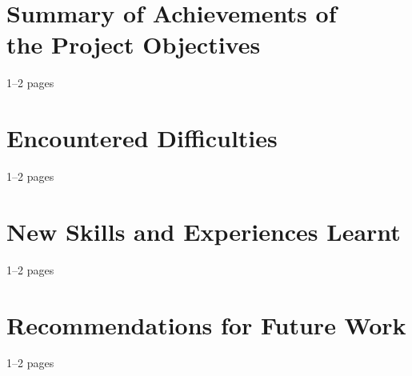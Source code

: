 \begin{chapterpage}
\end{chapterpage}
\section[Summary of Achievements of the Project Objectives]{Summary of Achievements of\\the Project Objectives}
1--2 pages
\section{Encountered Difficulties}
1--2 pages
\section{New Skills and Experiences Learnt}
1--2 pages
\section{Recommendations for Future Work}
1--2 pages
